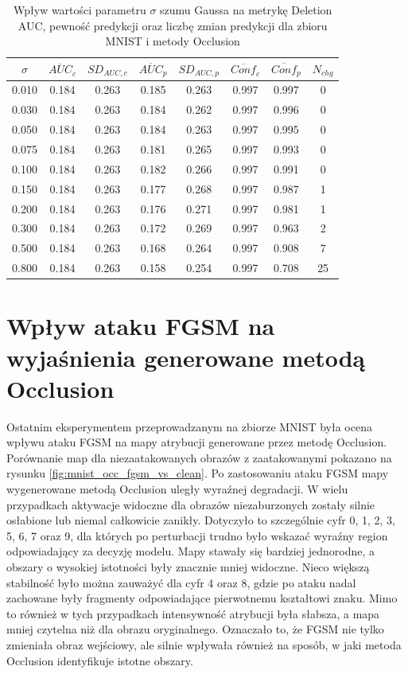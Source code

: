 \begin{table}[H] \centering \caption{Wpływ wartości parametru \(\sigma\) szumu Gaussa na metrykę Deletion AUC, pewność predykcji oraz liczbę zmian predykcji dla zbioru MNIST i metody Occlusion} \label{tab:occ_sg_auc_conf_mnist} \begin{tabular}{cccccccc} \toprule $\sigma$ & $\overline{AUC}_{c}$ & $SD_{AUC,c}$ & $\overline{AUC}_{p}$ & $SD_{AUC,p}$ & $\overline{Conf}_{c}$ & $\overline{Conf}_{p}$ & $N_{chg}$ \\ \midrule 0.010 & 0.184 & 0.263 & 0.185 & 0.263 & 0.997 & 0.997 & 0 \\ 0.030 & 0.184 & 0.263 & 0.184 & 0.262 & 0.997 & 0.996 & 0 \\ 0.050 & 0.184 & 0.263 & 0.184 & 0.263 & 0.997 & 0.995 & 0 \\ 0.075 & 0.184 & 0.263 & 0.181 & 0.265 & 0.997 & 0.993 & 0 \\ 0.100 & 0.184 & 0.263 & 0.182 & 0.266 & 0.997 & 0.991 & 0 \\ 0.150 & 0.184 & 0.263 & 0.177 & 0.268 & 0.997 & 0.987 & 1 \\ 0.200 & 0.184 & 0.263 & 0.176 & 0.271 & 0.997 & 0.981 & 1 \\ 0.300 & 0.184 & 0.263 & 0.172 & 0.269 & 0.997 & 0.963 & 2 \\ 0.500 & 0.184 & 0.263 & 0.168 & 0.264 & 0.997 & 0.908 & 7 \\ 0.800 & 0.184 & 0.263 & 0.158 & 0.254 & 0.997 & 0.708 & 25 \\ \bottomrule \end{tabular} \end{table}

\section{Wpływ ataku FGSM na wyjaśnienia generowane metodą Occlusion}
\label{sec:occ_vs_fgsm_mnist}

Ostatnim eksperymentem przeprowadzanym na zbiorze MNIST była ocena wpływu ataku FGSM na mapy atrybucji generowane przez metodę Occlusion. Porównanie map dla niezaatakowanych obrazów z zaatakowanymi pokazano na rysunku \ref{fig:mnist_occ_fgsm_vs_clean}. Po zastosowaniu ataku FGSM mapy wygenerowane metodą Occlusion uległy wyraźnej degradacji. W wielu przypadkach aktywacje widoczne dla obrazów niezaburzonych zostały silnie osłabione lub niemal całkowicie zanikły. Dotyczyło to szczególnie cyfr 0, 1, 2, 3, 5, 6, 7 oraz 9, dla których po perturbacji trudno było wskazać wyraźny region odpowiadający za decyzję modelu. Mapy stawały się bardziej jednorodne, a obszary o wysokiej istotności były znacznie mniej widoczne. Nieco większą stabilność było można zauważyć dla cyfr 4 oraz 8, gdzie po ataku nadal zachowane były fragmenty odpowiadające pierwotnemu kształtowi znaku. Mimo to również w tych przypadkach intensywność atrybucji była słabsza, a mapa mniej czytelna niż dla obrazu oryginalnego. Oznaczało to, że FGSM nie tylko zmieniała obraz wejściowy, ale silnie wpływała również na sposób, w jaki metoda Occlusion identyfikuje istotne obszary.

